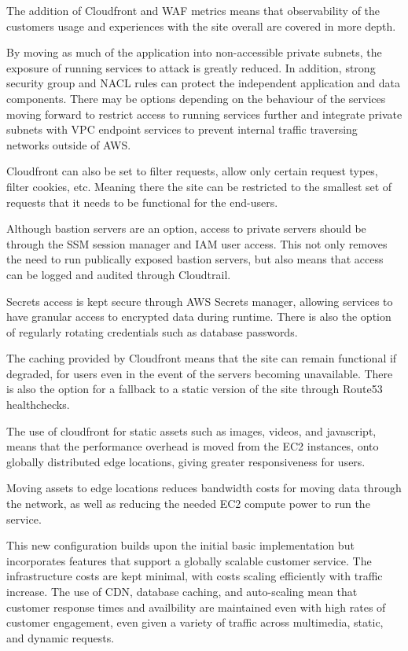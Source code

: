 
The addition of Cloudfront and WAF metrics means that observability of the customers usage and experiences with the site overall are covered in more depth. 


By moving as much of the application into non-accessible private subnets, the exposure of running services to attack is greatly reduced. In addition, strong security group and NACL rules can protect the independent application and data components. There may be options depending on the behaviour of the services moving forward to restrict access to running services further and integrate private subnets with VPC endpoint services to prevent internal traffic traversing networks outside of AWS.

Cloudfront can also be set to filter requests, allow only certain request types, filter cookies, etc. Meaning there the site can be restricted to the smallest set of requests that it needs to be functional for the end-users.

Although bastion servers are an option, access to private servers should be through the SSM session manager and IAM user access. This not only removes the need to run publically exposed bastion servers, but also means that access can be logged and audited through Cloudtrail.

Secrets access is kept secure through AWS Secrets manager, allowing services to have granular access to encrypted data during runtime. There is also the option of regularly rotating credentials such as database passwords.


The caching provided by Cloudfront means that the site can remain functional if degraded, for users even in the event of the servers becoming unavailable. There is also the option for a fallback to a static version of the site through Route53 healthchecks.


The use of cloudfront for static assets such as images, videos, and javascript, means that the performance overhead is moved from the EC2 instances, onto globally distributed edge locations, giving greater responsiveness for users.



Moving assets to edge locations reduces bandwidth costs for moving data through the network, as well as reducing the needed EC2 compute power to run the service.


This new configuration builds upon the initial basic implementation but incorporates features that support a globally scalable customer service. The infrastructure costs are kept minimal, with costs scaling efficiently with traffic increase. The use of CDN, database caching, and auto-scaling mean that customer response times and availbility are maintained even with high rates of customer engagement, even given a variety of traffic across multimedia, static, and dynamic requests.
